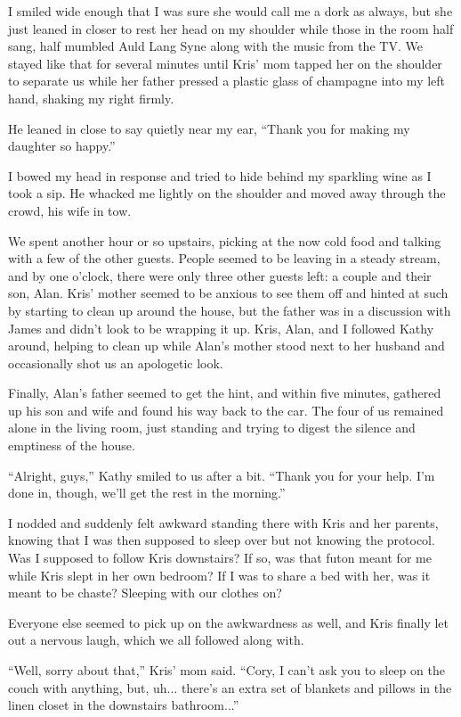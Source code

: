 I smiled wide enough that I was sure she would call me a dork as always, but she just leaned in closer to rest her head on my shoulder while those in the room half sang, half mumbled Auld Lang Syne along with the music from the TV.  We stayed like that for several minutes until Kris' mom tapped her on the shoulder to separate us while her father pressed a plastic glass of champagne into my left hand, shaking my right firmly.

He leaned in close to say quietly near my ear, ``Thank you for making my daughter so happy.''

I bowed my head in response and tried to hide behind my sparkling wine as I took a sip.  He whacked me lightly on the shoulder and moved away through the crowd, his wife in tow.

We spent another hour or so upstairs, picking at the now cold food and talking with a few of the other guests.  People seemed to be leaving in a steady stream, and by one o'clock, there were only three other guests left: a couple and their son, Alan.  Kris' mother seemed to be anxious to see them off and hinted at such by starting to clean up around the house, but the father was in a discussion with James and didn't look to be wrapping it up.  Kris, Alan, and I followed Kathy around, helping to clean up while Alan's mother stood next to her husband and occasionally shot us an apologetic look.

Finally, Alan's father seemed to get the hint, and within five minutes, gathered up his son and wife and found his way back to the car.  The four of us remained alone in the living room, just standing and trying to digest the silence and emptiness of the house.

``Alright, guys,'' Kathy smiled to us after a bit.  ``Thank you for your help.  I'm done in, though, we'll get the rest in the morning.''

I nodded and suddenly felt awkward standing there with Kris and her parents, knowing that I was then supposed to sleep over but not knowing the protocol.  Was I supposed to follow Kris downstairs?  If so, was that futon meant for me while Kris slept in her own bedroom?  If I was to share a bed with her, was it meant to be chaste?  Sleeping with our clothes on?

Everyone else seemed to pick up on the awkwardness as well, and Kris finally let out a nervous laugh, which we all followed along with.  

``Well, sorry about that,'' Kris' mom said.  ``Cory, I can't ask you to sleep on the couch with anything, but, uh... there's an extra set of blankets and pillows in the linen closet in the downstairs bathroom...''


